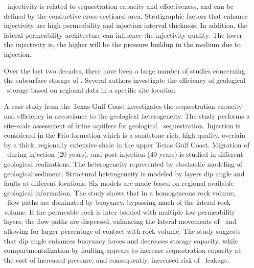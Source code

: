 \coo\ injectivity is related to sequestration capacity and effectiveness, and can be defined by the conductive cross-sectional area. Stratigraphic factors that enhance injectivity are high permeability and injection interval thickness. In addition, the lateral permeability architecture can influence the injectivity quality. The lower the injectivity is, the higher will be the pressure buildup in the medium due to injection.


Over the last two decades, there have been a large number of studies concerning the subsurface storage of \coo. Several authors investigate the efficiency of geological \coo\ storage based on regional data in a specific site location.

A case study from the Texas Gulf Coast \cite{hovorka2004impact} investigates the sequestration capacity and efficiency in accordance to the geological heterogeneity. The study performs a site-scale assessment of brine aquifers for geological \coo\ sequestration. Injection is considered in the Frio formation which is a sandstone-rich, high quality, overlain by a thick, regionally extensive shale in the upper Texas Gulf Coast. Migration of \coo\ during injection (20 years), and post-injection (40 years) is studied in different geological realizations. The heterogeneity represented by stochastic modeling of geological sediment. Structural heterogeneity is modeled by layers dip angle and faults at different locations. Six models are made based on regional available geological information. The study shows that in a homogeneous rock volume, \coo\ flow paths are dominated by buoyancy, bypassing much of the lateral rock volume. If the permeable rock is inter-bedded with multiple low permeability layers, the flow paths are dispersed, enhancing the lateral movements of  \coo\ and allowing for larger percentage of contact with rock volume. The study suggests that dip angle enhances buoyancy forces and decreases storage capacity, while compartmentalization by faulting appears to increase sequestration capacity at the cost of increased pressure, and consequently, increased risk of \coo\ leakage.

